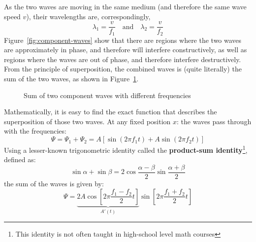 As the two waves are moving in the same medium (and therefore the same wave
speed $v$), their wavelengths are, correspondingly,
\begin{equation*}
  \lambda_1=\frac v{f_1}\quad\text{and}\quad\lambda_2=\frac v{f_2}
\end{equation*}
Figure~\ref{fig:component-waves} show that there are regions where the two waves
are approximately in phase, and therefore will interfere constructively, as
well as regions where the waves are out of phase, and therefore interfere
destructively. From the principle of superposition, the combined waves is
(quite literally) the sum of the two waves, as shown in Figure~\ref{fig:sum}.
\begin{figure}[ht]
  \centering
  \caption{Sum of two component waves with different frequencies}
  \label{fig:sum}
\end{figure}
Mathematically, it is easy to find the exact function that describes the
superposition of those two waves. At any fixed position $x$: the waves pass
through with the frequencies:
\begin{equation}
  \Psi = \Psi_1 + \Psi_2 = A\left[\sin(2\pi f_1t)+A\sin(2\pi f_2t)\right]
\end{equation}
Using a lesser-known trigonometric identity called the \textbf{product-sum
  identity}\footnote{This identity is not often taught in high-school level
math courses}, defined as: %
\begin{equation}
  \sin\alpha+\sin\beta=2\cos\frac{\alpha-\beta}2\sin\frac{\alpha+\beta}2
\end{equation}
the sum of the waves is given by:
\begin{equation}
  \Psi = \underbrace{2A\cos\left[2\pi\frac{f_1-f_2}2t\right]}_{A'(t)}
  \sin\left[2\pi\frac{f_1+f_2}2t\right]
  \label{eq:sum}
\end{equation}
